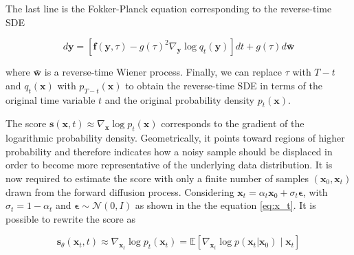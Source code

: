 \begin{compactproof}[title={Proof}]
The last line is the Fokker-Planck equation corresponding to the reverse-time SDE

\begin{equation*}
\boxed{
d\mathbf{y}
=
\left[
\mathbf{f}(\mathbf{y},\tau)
-
g(\tau)^2
\nabla_{\mathbf{y}}
\log q_t(\mathbf{y})
\right]dt
+
g(\tau)d\bar{\mathbf{w}}
}
\end{equation*}

where $\bar{\mathbf{w}}$ is a reverse-time Wiener process. Finally, we can replace $\tau$ with $T-t$ and $q_t(\mathbf{x})$ with $p_{T-t}(\mathbf{x})$ to obtain the reverse-time SDE in terms of the original time variable $t$ and the original probability density $p_t(\mathbf{x})$.     

\end{compactproof}

The score $\mathbf{s}(\mathbf{x},t) \approx \nabla_{\mathbf{x}}\log p_t(\mathbf{x})$ corresponds to the gradient of the logarithmic probability density. Geometrically, it points toward regions of higher probability and therefore indicates how a noisy sample should be displaced in order to become more representative of the underlying data distribution. It is now required to estimate the score with only a finite number of samples $(\mathbf{x}_{0},\mathbf{x}_{t})$ drawn from the forward diffusion process. Considering $\mathbf{x}_{t} = \alpha_{t}\mathbf{x}_{0} + \sigma_{t}\boldsymbol{\epsilon}$, with $\sigma_{t}=1-\alpha_{t}$ and $\boldsymbol{\epsilon} \sim \mathcal{N}(0, I)$ as shown in the the equation \ref{eq:x_t}. It is possible to rewrite the score as

\begin{equation}
    \mathbf{s}_{\theta}(\mathbf{x}_t,t)
    \approx
    \nabla_{\mathbf{x}_t}\log p_t(\mathbf{x}_t)
    =
    \mathbb{E}[
        \nabla_{\mathbf{x}_t}\log p(\mathbf{x}_t|\mathbf{x}_0)
        \mid
        \mathbf{x}_t
    ]
\end{equation}

